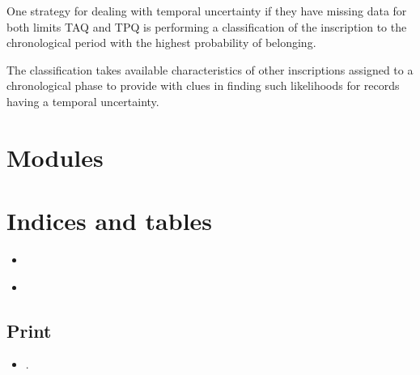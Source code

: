\documentclass[a4paper,12pt,english]{sphinxhowto}
\begin{document}
One strategy for dealing with temporal uncertainty if they have missing data for both limits TAQ and TPQ is performing a classification of the inscription to the chronological period with the highest probability of belonging.

The classification takes available characteristics of other inscriptions assigned to a chronological phase to provide with clues in finding such likelihoods for records having a temporal uncertainty.


\section{Modules}
\label{\detokenize{modules:modules}}\label{\detokenize{modules::doc}}

\section{Indices and tables}
\label{\detokenize{index:indices-and-tables}}\begin{itemize}
\item {} 

\end{itemize}
\begin{itemize}
\item {} 

\end{itemize}


\subsection{Print}
\label{\detokenize{index:print}}\begin{itemize}
\item {} 
.

\end{itemize}



\renewcommand{\indexname}{Index}
\printindex
\end{document}
